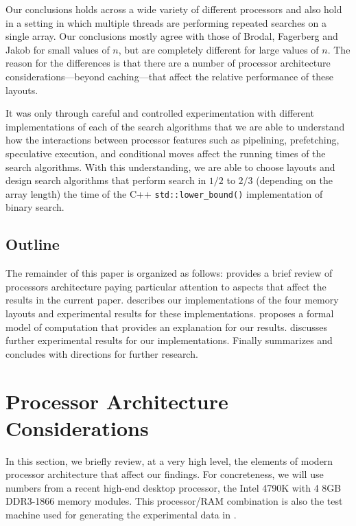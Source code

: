 \documentclass{patmorin}
\begin{document}
Our conclusions holds across a wide variety of different processors and
also hold in a setting in which multiple threads are performing repeated
searches on a single array.  Our conclusions mostly agree with those of
Brodal, Fagerberg and Jakob for small values of $n$, but are completely
different for large values of $n$.  The reason for the differences is
that there are a number of processor architecture considerations---beyond
caching---that affect the relative performance of these layouts.

It was only through careful and controlled experimentation with different
implementations of each of the search algorithms that we are able
to understand how the interactions between processor features such
as pipelining, prefetching, speculative execution, and conditional
moves affect the running times of the search algorithms.  With this
understanding, we are able to choose layouts and design search algorithms
that perform search in $1/2$ to $2/3$ (depending on the array length)
the time of the C++ \texttt{std::lower_bound()} implementation
of binary search.

\subsection{Outline}

The remainder of this paper is organized as follows: 
provides a brief review of processors architecture paying particular
attention to aspects that affect the results in the current paper.
 describes our implementations of the four memory layouts
and experimental results for these implementations. 
proposes a formal model of computation that provides an explanation for
our results.   discusses further experimental results
for our implementations.  Finally  summarizes and
concludes with directions for further research.

\section{Processor Architecture Considerations}

In this section, we briefly review, at a very high level, the elements of
modern processor architecture that affect our findings.  For concreteness,
we will use numbers from a recent high-end desktop processor, the
Intel 4790K \cite{intel:4790k} with 4 8GB DDR3-1866 memory modules.
This processor/RAM combination is also the test machine used for
generating the experimental data in .
\end{document}
